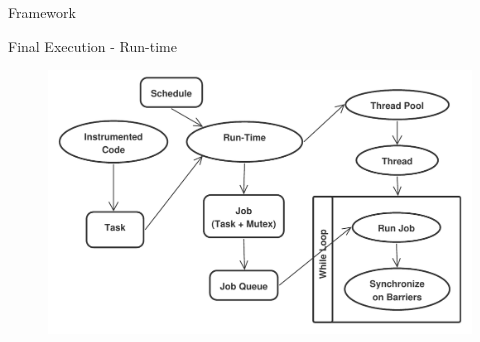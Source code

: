 \documentclass[xcolor=dvipsnames]{beamer}
\begin{document}
\begin{section}{Framework}
\begin{frame}{\hskip 0.3cm Final Execution - Run-time}
\begin{figure}
\centering
\includegraphics[scale=0.40]{runtime_execution.pdf}
\end{figure}




\end{frame}











\end{section}
\end{document}
